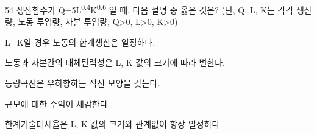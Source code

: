 \begin{question}{54}
생산함수가 Q=5L\textsuperscript{0.4}K\textsuperscript{0.6} 일 때, 다음 설명 중 옳은 것은? (단, Q, L, K는 각각 생산량, 노동 투입량, 자본 투입량, Q>0, L>0, K>0)
\begin{choices}
  \item L=K일 경우 노동의 한계생산은 일정하다.
  \item 노동과 자본간의 대체탄력성은 L, K 값의 크기에 따라 변한다.
  \item 등량곡선은 우하향하는 직선 모양을 갖는다.
  \item 규모에 대한 수익이 체감한다.
  \item 한계기술대체율은 L, K 값의 크기와 관계없이 항상 일정하다.
\end{choices}
\end{question}

